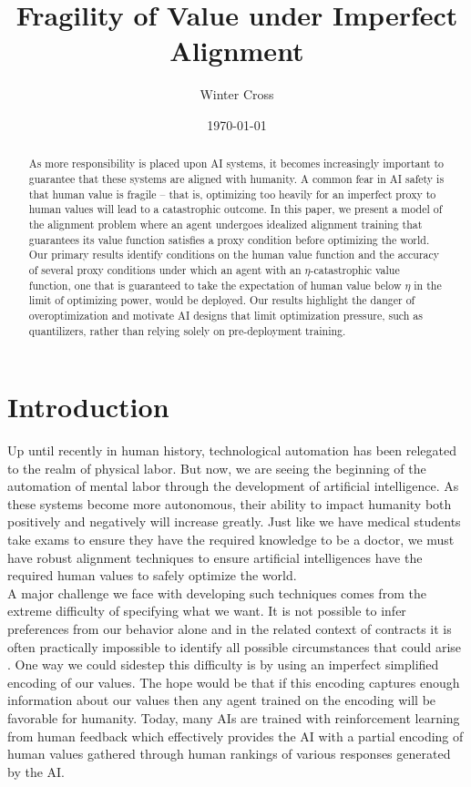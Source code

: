 \documentclass{article}
\title{Fragility of Value under Imperfect Alignment}
\author{Winter Cross}
\affil{Dovetail Research}
\date{\today}
\begin{document}
\maketitle

\begin{abstract}
As more responsibility is placed upon AI systems, it becomes increasingly important to guarantee that these systems are aligned with humanity. A common fear in AI safety is that human value is fragile -- that is, optimizing too heavily for an imperfect proxy to human values will lead to a catastrophic outcome. In this paper, we present a model of the alignment problem where an agent undergoes idealized alignment training that guarantees its value function satisfies a proxy condition before optimizing the world. Our primary results identify conditions on the human value function and the accuracy of several proxy conditions under which an agent with an $\eta$-catastrophic value function, one that is guaranteed to take the expectation of human value below $\eta$ in the limit of optimizing power, would be deployed. Our results highlight the danger of overoptimization and motivate AI designs that limit optimization pressure, such as quantilizers, rather than relying solely on pre-deployment training.
\end{abstract}

\section{Introduction}\label{sec:introduction}
Up until recently in human history, technological automation has been relegated to the realm of physical labor. But now, we are seeing the beginning of the automation of mental labor through the development of artificial intelligence. As these systems become more autonomous, their ability to impact humanity both positively and negatively will increase greatly. Just like we have medical students take exams to ensure they have the required knowledge to be a doctor, we must have robust alignment techniques to ensure artificial intelligences have the required human values to safely optimize the world.\\

A major challenge we face with developing such techniques comes from the extreme difficulty of specifying what we want. It is not possible to infer preferences from our behavior alone \citep{armstrong2018occam} and in the related context of contracts it is often practically impossible to identify all possible circumstances that could arise \citep{hadfield2019incomplete}. One way we could sidestep this difficulty is by using an imperfect simplified encoding of our values. The hope would be that if this encoding captures enough information about our values then any agent trained on the encoding will be favorable for humanity. Today, many AIs are trained with reinforcement learning from human feedback which effectively provides the AI with a partial encoding of human values gathered through human rankings of various responses generated by the AI.\\
\end{document}
